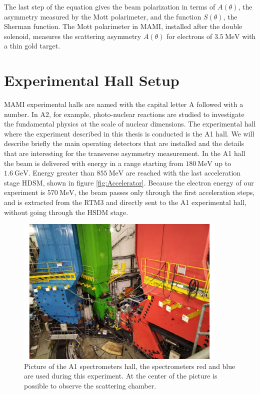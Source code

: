 The last step of the equation gives the beam polarization in terms of $A(\theta)$, the asymmetry measured by the Mott polarimeter, and the function $S(\theta)$, the Sherman function. The Mott polarimeter in MAMI, installed after the double solenoid, measures the scattering asymmetry $A(\theta)$ for electrons of $\SI{3.5}{\mega \electronvolt}$ with a thin gold target.  

\newpage
\section{Experimental Hall Setup} \label{ExperimentalHall}

MAMI experimental halls are named with the capital letter A followed with a number. In A2, for example, photo-nuclear reactions are studied to investigate the fundamental physics at the scale of nuclear dimensions. The experimental hall where the experiment described in this thesis is conducted is the A1 hall. We will describe briefly the main operating detectors that are installed and the details that are interesting for the transverse asymmetry measurement.
In the A1 hall the beam is delivered with energy in a range starting from $\SI{180}{\mega \electronvolt}$ up to $\SI{1.6}{\giga \electronvolt}$. Energy greater than $\SI{855}{\mega \electronvolt}$ are reached with the last acceleration stage HDSM, shown in figure \ref{fig:Accelerator}. Because the electron energy of our experiment is $\SI{570}{\mega \electronvolt}$, the beam passes only through the first acceleration steps, and is extracted from the RTM3 and directly sent to the A1 experimental hall, without going through the HSDM stage. 

\begin{figure}[!h]
\centering
\includegraphics[width = 0.9\textwidth]{figures/twoSpektrometer.pdf}
\caption{Picture of the A1 spectrometers hall, the spectrometers red and blue are used during this experiment. At the center of the picture is possible to observe the scattering chamber.}
\label{fig:TwoSpektr}
\end{figure}

